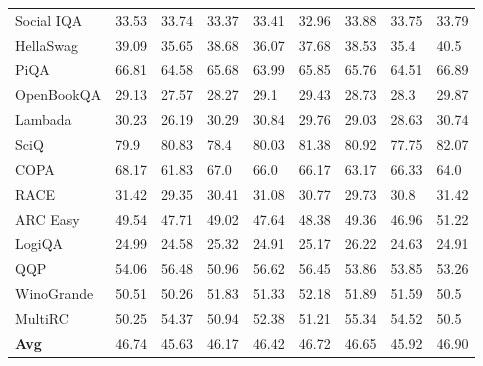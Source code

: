 \documentclass{article}
\theoremstyle{definition}
\theoremstyle{remark}
\begin{document}
\begin{table}[!ht]
\begin{tabular}{lllllllll}
        Social IQA & 33.53 & 33.74 & 33.37 & 33.41 & 32.96 & 33.88 & 33.75 & 33.79 \\ 
        HellaSwag & 39.09 & 35.65 & 38.68 & 36.07 & 37.68 & 38.53 & 35.4 & 40.5 \\ 
        PiQA & 66.81 & 64.58 & 65.68 & 63.99 & 65.85 & 65.76 & 64.51 & 66.89 \\ 
        OpenBookQA & 29.13 & 27.57 & 28.27 & 29.1 & 29.43 & 28.73 & 28.3 & 29.87 \\ 
        Lambada & 30.23 & 26.19 & 30.29 & 30.84 & 29.76 & 29.03 & 28.63 & 30.74 \\ 
        SciQ & 79.9 & 80.83 & 78.4 & 80.03 & 81.38 & 80.92 & 77.75 & 82.07 \\ 
        COPA & 68.17 & 61.83 & 67.0 & 66.0 & 66.17 & 63.17 & 66.33 & 64.0 \\ 
        RACE & 31.42 & 29.35 & 30.41 & 31.08 & 30.77 & 29.73 & 30.8 & 31.42 \\ 
        ARC Easy & 49.54 & 47.71 & 49.02 & 47.64 & 48.38 & 49.36 & 46.96 & 51.22 \\ 
        LogiQA & 24.99 & 24.58 & 25.32 & 24.91 & 25.17 & 26.22 & 24.63 & 24.91 \\ 
        QQP & 54.06 & 56.48 & 50.96 & 56.62 & 56.45 & 53.86 & 53.85 & 53.26 \\ 
        WinoGrande & 50.51 & 50.26 & 51.83 & 51.33 & 52.18 & 51.89 & 51.59 & 50.5 \\ 
        MultiRC & 50.25 & 54.37 & 50.94 & 52.38 & 51.21 & 55.34 & 54.52 & 50.5 \\ 
        \midrule
        \textbf{Avg} & 46.74 & 45.63 & 46.17 & 46.42 & 46.72 & 46.65 & 45.92 & 46.90 \\ \bottomrule
    \end{tabular}
\end{table}
\end{document}
